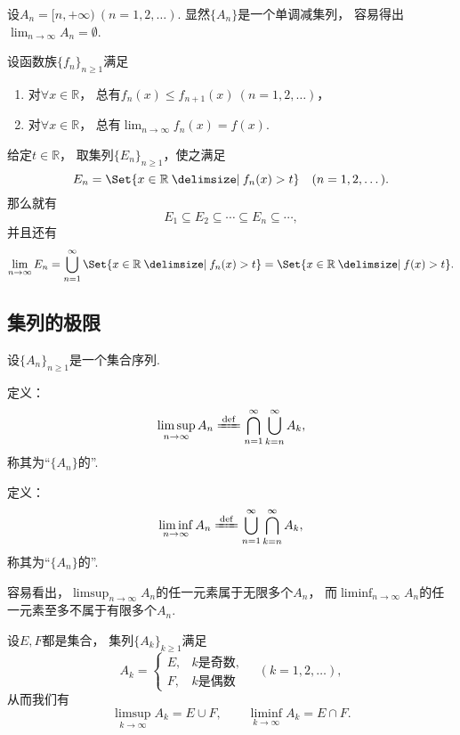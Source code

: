 \begin{example}
设\(A_n = [n,+\infty)\ (n=1,2,\dotsc)\).
显然\(\{A_n\}\)是一个单调减集列，
容易得出\(\lim_{n\to\infty} A_n = \emptyset\).
\end{example}

\begin{example}
设函数族\(\{f_n\}_{n\geq1}\)满足
\begin{enumerate}
	\item 对\(\forall x\in\mathbb{R}\)，
	总有\(f_n(x) \leq f_{n+1}(x)\ (n=1,2,\dotsc)\)，
	\item 对\(\forall x\in\mathbb{R}\)，
	总有\(\lim_{n\to\infty} f_n(x) = f(x)\).
\end{enumerate}
给定\(t\in\mathbb{R}\)，
取集列\(\{E_n\}_{n\geq1}\)，使之满足\[
	E_n = \Set{ x\in\mathbb{R} \given f_n(x) > t }
	\quad(n=1,2,\dotsc).
\]
那么就有\[
	E_1 \subseteq E_2 \subseteq \dotsb \subseteq E_n \subseteq \dotsb,
\]
并且还有\[
	\lim_{n\to\infty} E_n
	= \bigcup_{n=1}^\infty \Set{ x\in\mathbb{R} \given f_n(x) > t }
	= \Set{ x\in\mathbb{R} \given f(x) > t }.
\]
\end{example}

\subsection{集列的极限}
\begin{definition}
设\(\{A_n\}_{n\geq1}\)是一个集合序列.

定义：\[
	\limsup_{n\to\infty} A_n
	\defeq
	\bigcap_{n=1}^\infty
	\bigcup_{k=n}^\infty
	A_k,
\]
称其为“\(\{A_n\}\)的”.

定义：\[
	\liminf_{n\to\infty} A_n
	\defeq
	\bigcup_{n=1}^\infty
	\bigcap_{k=n}^\infty
	A_k,
\]
称其为“\(\{A_n\}\)的”.
\end{definition}
容易看出，\(\limsup_{n\to\infty} A_n\)的任一元素属于无限多个\(A_n\)，
而\(\liminf_{n\to\infty} A_n\)的任一元素至多不属于有限多个\(A_n\).

\begin{example}
设\(E,F\)都是集合，
集列\(\{A_k\}_{k\geq1}\)满足\[
	A_k = \left\{ \begin{array}{cl}
		E, & \text{$k$是奇数}, \\
		F, & \text{$k$是偶数}
	\end{array} \right.
	\quad(k=1,2,\dotsc),
\]
从而我们有\[
	\limsup_{k\to\infty} A_k
	= E \cup F, \qquad
	\liminf_{k\to\infty} A_k
	= E \cap F.
\]
\end{example}

